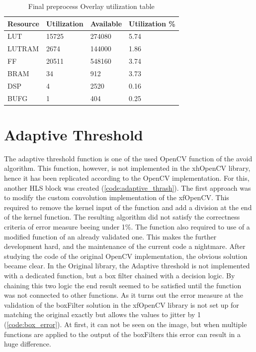 
\begin{table}
\centering
\caption{Final preprocess Overlay utilization table}
\label{tab:preproc_final_usage}
\begin{tabular}{|l|l|l|l|}
\hline
Resource & Utilization & Available & Utilization \% \\ \hline
LUT & 15725 & 274080 & 5.74 \\ \hline
LUTRAM & 2674 & 144000 & 1.86 \\ \hline
FF & 20511 & 548160 & 3.74 \\ \hline
BRAM & 34 & 912 & 3.73 \\ \hline
DSP & 4 & 2520 & 0.16 \\ \hline
BUFG & 1 & 404 & 0.25 \\ \hline
\end{tabular}
\end{table}


\clearpage

\section{Adaptive Threshold} %
The adaptive threshold function is one of the used OpenCV function of the avoid algorithm.
This function, however, is not implemented in the xhOpenCV library, hence it has been replicated according to the OpenCV implementation.
For this, another HLS block was created (\cref{code:adaptive_thrash}).
The first approach was to modify the custom convolution implementation of the xfOpenCV.
This required to remove the kernel input of the function and add a division at the end of the kernel function.
The resulting algorithm did not satisfy the correctness criteria of error measure beeing under 1\%.
The function also required to use of a modified function of an already validated one.
This makes the further development hard, and the maintenance of the current code a nightmare.
After studying the code of the original OpenCV implementation, the obvious solution became clear.
In the Original library, the Adaptive threshold is not implemented with a dedicated function, but a box filter chained with a decision logic.
By chaining this two logic the end result seemed to be satisfied until the function was not connected to other functions.
As it turns out the error measure at the validation of the boxFilter solution in the xfOpenCV library is not set up for matching the original exactly but allows the values to jitter by 1 (\cref{code:box_error}).
At first, it can not be seen on the image, but when multiple functions are applied to the output of the boxFilters this error can result in a huge difference.

